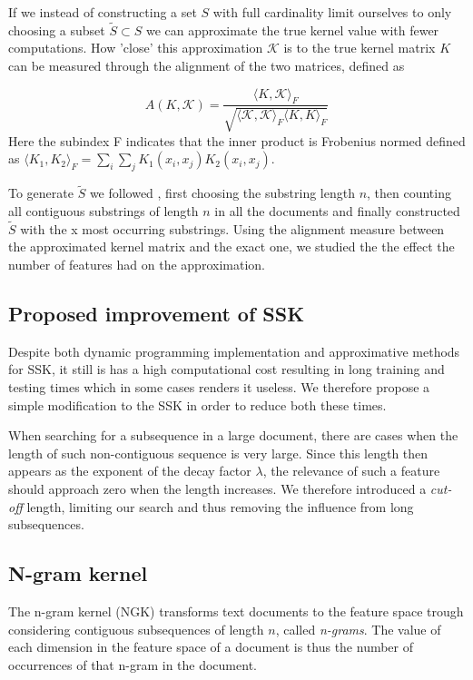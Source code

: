 If we instead of constructing a set $ S $ with full cardinality limit ourselves to only choosing a subset $ \tilde{S} \subset S $ we can approximate the true kernel value with fewer computations. How 'close' this approximation $ \mathcal{K} $ is to the true kernel matrix $ K $ can be measured through the alignment of the two matrices, defined as

\begin{equation}\label{key}
A(K,\mathcal{K}) = \dfrac{\langle K, \mathcal{K}\rangle_{F}}{\sqrt{\langle \mathcal{K}, \mathcal{K}\rangle_{F} \langle K, K\rangle_{F} }}
\end{equation}
Here the subindex F indicates that the inner product is Frobenius normed defined as $ \langle K_1,K_2 \rangle_{F} = \sum_{i}\sum_{j}K_1(x_i,x_j)K_2(x_i,x_j) $.

To generate $ \tilde{S} $ we followed \cite{lodhi}, first choosing the substring length $ n $, then counting all contiguous substrings of length $ n $ in all the documents and finally constructed $ \tilde{S} $ with the x most occurring substrings. Using the alignment measure between the approximated kernel matrix and the exact one, we studied the the effect the number of features had on the approximation. 

\subsection{Proposed improvement of SSK}
Despite both dynamic programming implementation and approximative methods for SSK, it still is has a high computational cost resulting in long training and testing times which in some cases renders it useless. We therefore propose a simple modification to the SSK in order to reduce both these times. 

When searching for a subsequence in a large document, there are cases when the length of such non-contiguous sequence is very large. Since this length then appears as the exponent of the decay factor $ \lambda $, the relevance of such a feature should approach zero when the length increases. We therefore introduced a \textit{cut-off} length, limiting our search and thus removing the influence from long subsequences. 


\subsection{N-gram kernel}
The n-gram kernel (NGK) transforms text documents to the feature space trough  considering contiguous subsequences of length $ n $, called \textit{n-grams}. The value of each dimension in the feature space of a document is thus the number of occurrences of that n-gram in the document. 

